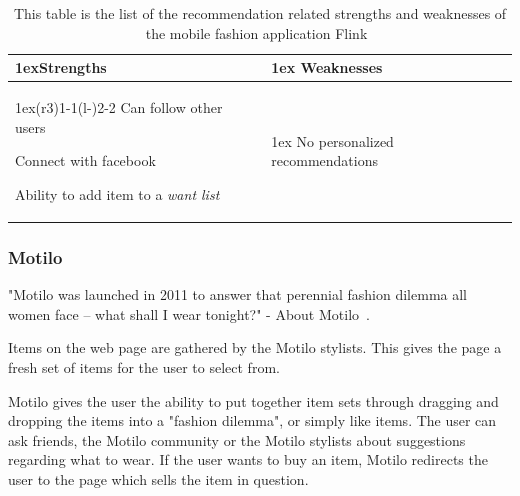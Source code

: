 \begin{table}[H]
  \centering
  \begin{tabularx}{\linewidth}{>{\parskip1ex}X@{\kern4\tabcolsep}>{\parskip1ex}X}
    \toprule
    \hfil\bfseries Strengths
    &
    \hfil\bfseries Weaknesses
    \\\cmidrule(r{3\tabcolsep}){1-1}\cmidrule(l{-\tabcolsep}){2-2}
    Can follow other users \par
    Connect with facebook \par
    Ability to add item to a \emph{want list} \par
    &
    No personalized recommendations \par
    \\\bottomrule
 \end{tabularx}
 \caption[Recommendation related strengths and weaknesses of Flink~\cite{flink}]{This table is the list of the recommendation related strengths and weaknesses of the mobile fashion application Flink~\cite{flink}}
 \label{table:iphoneAppFlink}
\end{table}

\subsubsection{Motilo} %
\label{par:motilo}
    "Motilo was launched in 2011 to answer that perennial fashion dilemma all women face -- what shall I wear tonight?" - About Motilo~\cite{motilo}.

    Items on the web page are gathered by the Motilo stylists.
    This gives the page a fresh set of items for the user to select from.

    Motilo gives the user the ability to put together item sets through dragging and dropping the items into a "fashion dilemma", or simply like items.
    The user can ask friends, the Motilo community or the Motilo stylists about suggestions regarding what to wear.
    If the user wants to buy an item, Motilo redirects the user to the page which sells the item in question.


